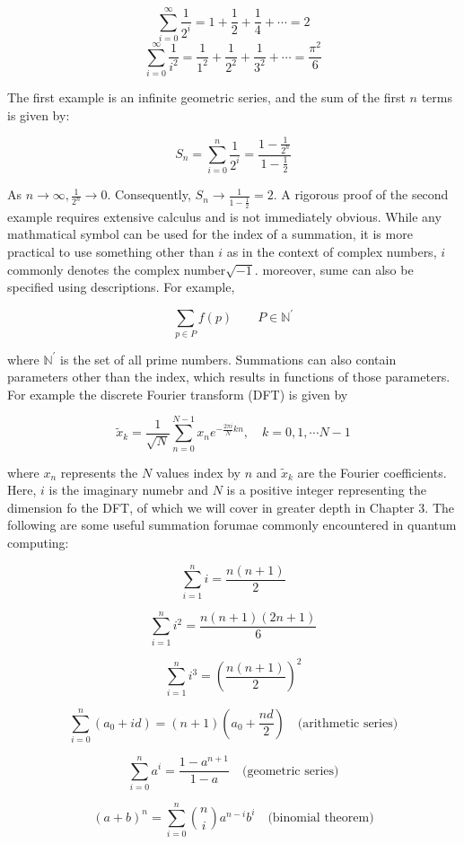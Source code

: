 \documentclass[12pt]{article}
\begin{document}
$$\sum_{i=0}^{\infty} \frac{1}{2^i} = 1 + \frac{1}{2} + \frac{1}{4} + \cdots = 2$$
$$\sum_{i=0}^{\infty}  \frac{1}{i^2} = \frac{1}{1^2} + \frac{1}{2^2} + \frac{1}{3^2} + \cdots = \frac{\pi^2}{6}$$

The first example is an infinite geometric series, and the sum of the first $n$ terms is given by:

$$S_n = \sum_{i=0}^{n} \frac{1}{2^i} = \frac{1 - \frac{1}{2^n}}{1 - \frac{1}{2}}$$

As $n \rightarrow \infty, \frac{1}{2^n} \rightarrow 0$. Consequently, $S_n \rightarrow \frac{1}{1 - \frac{1}{2}} = 2$. A rigorous proof of the second example requires extensive calculus and is not immediately obvious. While any mathmatical symbol can be used for the index of a summation, it is more practical to use something other than $i$ as in the context of complex numbers, $i$ commonly denotes the complex number$\sqrt{-1}$. moreover, sume can also be specified using descriptions. For example, 

$$\sum_{p \in P} f(p) \qquad P \in \mathbb{N^\prime}$$

where $\mathbb{N^\prime}$ is the set of all prime numbers. Summations can also contain parameters other than the index, which results in functions of those parameters. For example the discrete Fourier transform (DFT) is given by

$$\tilde{x}_k = \frac{1}{\sqrt{N}} \sum_{n=0}^{N - 1} x_n e^{- \frac{2 \pi i}{N} kn}, \quad k = 0, 1, \cdots N-1$$

where $x_n$ represents the $N$ values index by $n$ and $\tilde{x}_k$ are the Fourier coefficients. Here, $i$ is the imaginary numebr and $N$ is a positive integer representing the dimension fo the DFT, of which we will cover in greater depth in Chapter 3. The following are some useful summation forumae commonly encountered in quantum computing:

\[
\sum_{i=1}^{n} i = \frac{n(n+1)}{2}
\]

\[
\sum_{i=1}^{n} i^2 = \frac{n(n+1)(2n+1)}{6}
\]

\[
\sum_{i=1}^{n} i^3 = \left(\frac{n(n+1)}{2}\right)^2
\]

\[
\sum_{i=0}^{n} \left(a_0 + id\right) = (n+1)\left(a_0 + \frac{nd}{2}\right) \quad \text{(arithmetic series)}
\]

\[
\sum_{i=0}^{n} a^i = \frac{1 - a^{n+1}}{1 - a} \quad \text{(geometric series)}
\]

\[
(a + b)^n = \sum_{i=0}^{n} \binom{n}{i} a^{n-i} b^i \quad \text{(binomial theorem)}
\]
\end{document}
